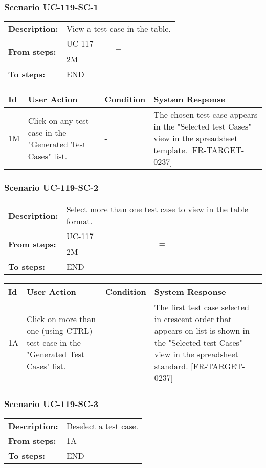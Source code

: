 \documentclass[a4paper,11pt]{article}
\newcommand{\bl}{\\ \hline}
\begin{document}
\subsubsection*{Scenario UC-119-SC-1}
\begin{tabular}{p{1in}p{4in}}
{\bf Description:} & View a test case in the table. \\
{\bf From steps:} & UC-117$$\equiv$$2M \\
{\bf To steps:} & END \\
\end{tabular}
 
\begin{tabular}{|p{0.8in}|p{1.6in}|p{1.6in}|p{1.6in}|}
\hline
Id & User Action & Condition & System Response  \bl 
1M & Click on any test case in the "Generated Test Cases" list. & - & The chosen test case appears in the "Selected test Cases" view in the spreadsheet template. [FR-TARGET-0237] \bl 
\end{tabular}
\subsubsection*{Scenario UC-119-SC-2}
\begin{tabular}{p{1in}p{4in}}
{\bf Description:} & Select more than one test case to view in the table format. \\
{\bf From steps:} & UC-117$$\equiv$$2M \\
{\bf To steps:} & END \\
\end{tabular}
 
\begin{tabular}{|p{0.8in}|p{1.6in}|p{1.6in}|p{1.6in}|}
\hline
Id & User Action & Condition & System Response  \bl 
1A & Click on more than one (using CTRL) test case in the "Generated Test Cases" list. & - & The first test case selected in crescent order that appears on list is shown in the "Selected test Cases" view in the spreadsheet standard. [FR-TARGET-0237] \bl 
\end{tabular}
\subsubsection*{Scenario UC-119-SC-3}
\begin{tabular}{p{1in}p{4in}}
{\bf Description:} & Deselect a test case. \\
{\bf From steps:} & 1A \\
{\bf To steps:} & END \\
\end{tabular}
 
\end{document}
